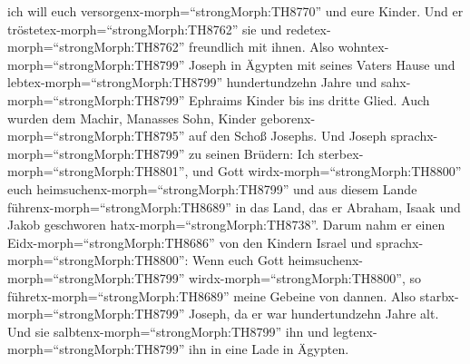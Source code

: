 ich will euch versorgenx-morph=``strongMorph:TH8770'' und eure Kinder.
Und er tröstetex-morph=``strongMorph:TH8762'' sie und
redetex-morph=``strongMorph:TH8762'' freundlich mit ihnen. 
Also wohntex-morph=``strongMorph:TH8799'' Joseph in Ägypten mit seines
Vaters Hause und lebtex-morph=``strongMorph:TH8799'' hundertundzehn
Jahre  und sahx-morph=``strongMorph:TH8799'' Ephraims
Kinder bis ins dritte Glied. Auch wurden dem Machir, Manasses Sohn,
Kinder geborenx-morph=``strongMorph:TH8795'' auf den Schoß Josephs.
 Und Joseph sprachx-morph=``strongMorph:TH8799'' zu seinen
Brüdern: Ich sterbex-morph=``strongMorph:TH8801'', und Gott
wirdx-morph=``strongMorph:TH8800'' euch
heimsuchenx-morph=``strongMorph:TH8799'' und aus diesem Lande
führenx-morph=``strongMorph:TH8689'' in das Land, das er Abraham, Isaak
und Jakob geschworen hatx-morph=``strongMorph:TH8738''. 
Darum nahm er einen Eidx-morph=``strongMorph:TH8686'' von den Kindern
Israel und sprachx-morph=``strongMorph:TH8800'': Wenn euch Gott
heimsuchenx-morph=``strongMorph:TH8799''
wirdx-morph=``strongMorph:TH8800'', so
führetx-morph=``strongMorph:TH8689'' meine Gebeine von dannen.
 Also starbx-morph=``strongMorph:TH8799'' Joseph, da er war
hundertundzehn Jahre alt. Und sie salbtenx-morph=``strongMorph:TH8799''
ihn und legtenx-morph=``strongMorph:TH8799'' ihn in eine Lade in
Ägypten.
